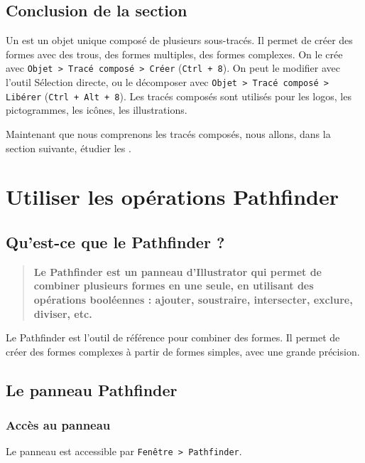 \subsection*{Conclusion de la section}

Un  est un objet unique composé de plusieurs sous-tracés. Il permet de créer des formes avec des trous, des formes multiples, des formes complexes. On le crée avec \texttt{Objet > Tracé composé > Créer} (\texttt{Ctrl + 8}). On peut le modifier avec l'outil Sélection directe, ou le décomposer avec \texttt{Objet > Tracé composé > Libérer} (\texttt{Ctrl + Alt + 8}). Les tracés composés sont utilisés pour les logos, les pictogrammes, les icônes, les illustrations.

Maintenant que nous comprenons les tracés composés, nous allons, dans la section suivante, étudier les .

\section{Utiliser les opérations Pathfinder}

\subsection{Qu'est-ce que le Pathfinder ?}

\begin{quote}
\textbf{Le Pathfinder est un panneau d'Illustrator qui permet de combiner plusieurs formes en une seule, en utilisant des opérations booléennes : ajouter, soustraire, intersecter, exclure, diviser, etc.}
\end{quote}

Le Pathfinder est l'outil de référence pour combiner des formes. Il permet de créer des formes complexes à partir de formes simples, avec une grande précision.

\subsection{Le panneau Pathfinder}

\subsubsection{Accès au panneau}

Le panneau  est accessible par \texttt{Fenêtre > Pathfinder}.

